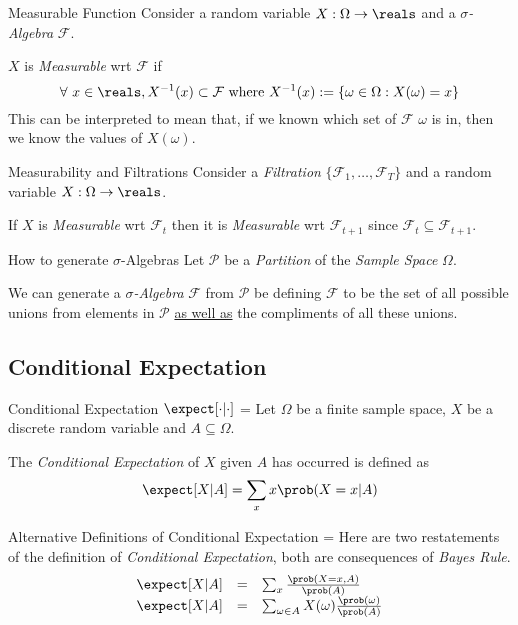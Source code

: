 \documentclass[11pt,a4paper]{article}
\begin{document}
  \begin{definition}{Measurable Function}
    Consider a random variable $X:\Omega\to\reals$ and a \textit{$\sigma$-Algebra} $\mathcal{F}$.
    \par $X$ is \textit{Measurable} wrt $\mathcal{F}$ if
    \[ \forall\ x\in\reals, X^{-1}(x)\subset\mathcal{F}\text{ where }X^{-1}(x):=\{\omega\in\Omega:X(\omega)=x\} \]
    This can be interpreted to mean that, if we known which set of $\mathcal{F}$ $\omega$ is in, then we know the values of $X(\omega)$.
  \end{definition}

  \begin{proposition}{Measurability and Filtrations}
    Consider a \textit{Filtration} $\{\mathcal{F}_1,\dots,\mathcal{F}_T\}$ and a random variable $X:\Omega\to\reals$.
    \par If $X$ is \textit{Measurable} wrt $\mathcal{F}_t$ then it is \textit{Measurable} wrt $\mathcal{F}_{t+1}$ since $\mathcal{F}_t\subseteq\mathcal{F}_{t+1}$.
  \end{proposition}

  \begin{proposition}{How to generate $\sigma$-Algebras}\label{prop_generate_sigma_algebras}
    Let $\mathcal{P}$ be a \textit{Partition} of the \textit{Sample Space} $\Omega$.
    \par We can generate a \textit{$\sigma$-Algebra} $\mathcal{F}$ from $\mathcal{P}$ be defining $\mathcal{F}$ to be the set of all possible unions from elements in $\mathcal{P}$ \underline{as well as} the compliments of all these unions.
  \end{proposition}

\subsection{Conditional Expectation}

  \begin{definition}{Conditional Expectation $\expect[\cdot|\cdot]$}
    \everymath={\displaystyle}
    Let $\Omega$ be a finite sample space, $X$ be a discrete random variable and $A\subseteq\Omega$.
    \par The \textit{Conditional Expectation} of $X$ given $A$ has occurred is defined as
    \[ \expect[X|A]=\sum_xx\prob(X=x|A) \]
  \end{definition}

  \begin{remark}{Alternative Definitions of Conditional Expectation}
    \everymath={\displaystyle}
    Here are two restatements of the definition of \textit{Conditional Expectation}, both are consequences of \textit{Bayes Rule}.
    \[\begin{array}{rcl}
      \expect[X|A]&=&\sum_x\frac{\prob(X=x,A)}{\prob(A)}\\
      \expect[X|A]&=&\sum_{\omega\in A}X(\omega)\frac{\prob(\omega)}{\prob(A)}
    \end{array}\]
  \end{remark}
\end{document}
